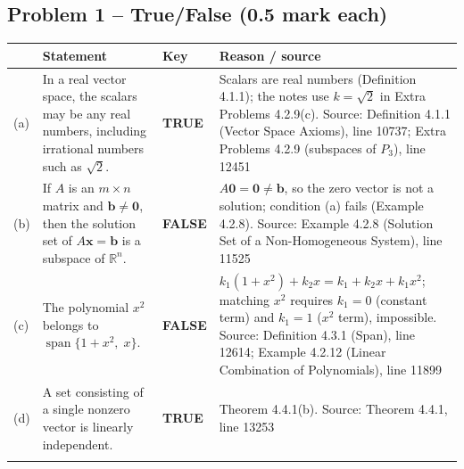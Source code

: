 \documentclass[11pt,a4paper]{article}
\newcommand{\Src}[1]{{\footnotesize\color{black!65}Source: #1}}
\begin{document}
\subsection*{Problem 1 -- True/False (0.5 mark each)}
\begin{tabularx}{\linewidth}{@{}l >{\raggedright\arraybackslash}X l >{\raggedright\arraybackslash}X@{}}\toprule & Statement & Key & Reason / source\\\midrule
(a) & In a real vector space, the scalars may be any real numbers, including irrational numbers such as $\sqrt{2}$. & \textbf{TRUE} & Scalars are real numbers (Definition 4.1.1); the notes use $k=\sqrt2$ in Extra Problems 4.2.9(c). \Src{Definition 4.1.1 (Vector Space Axioms), line 10737; Extra Problems 4.2.9 (subspaces of $P_3$), line 12451}\\\addlinespace
(b) & If $A$ is an $m\times n$ matrix and $\mathbf{b}\neq\mathbf{0}$, then the solution set of $A\mathbf{x}=\mathbf{b}$ is a subspace of $\mathbb{R}^n$. & \textbf{FALSE} & $A\mathbf{0}=\mathbf{0}\neq\mathbf{b}$, so the zero vector is not a solution; condition (a) fails (Example 4.2.8). \Src{Example 4.2.8 (Solution Set of a Non-Homogeneous System), line 11525}\\\addlinespace
(c) & The polynomial $x^2$ belongs to $\operatorname{span}\{1+x^2,\;x\}$. & \textbf{FALSE} & $k_1(1+x^2)+k_2x=k_1+k_2x+k_1x^2$; matching $x^2$ requires $k_1=0$ (constant term) and $k_1=1$ ($x^2$ term), impossible. \Src{Definition 4.3.1 (Span), line 12614; Example 4.2.12 (Linear Combination of Polynomials), line 11899}\\\addlinespace
(d) & A set consisting of a single nonzero vector is linearly independent. & \textbf{TRUE} & Theorem 4.4.1(b). \Src{Theorem 4.4.1, line 13253}\\\addlinespace
\bottomrule\end{tabularx}
\end{document}
